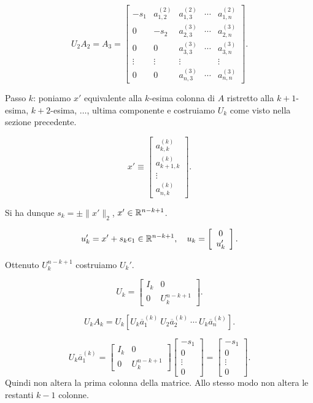 \[U_2A_2 = A_3 = \left[
\begin{array}{ccccc}
-s_1 & a_{1,2}^{(2)} & a_{1,3}^{(2)} &\cdots & a_{1,n}^{(2)} \\
0   & -s_2 & a_{2,3}^{(3)} &\cdots & a_{2,n}^{(3)} \\
0   & 0 & a_{3,3}^{(3)} &\cdots & a_{3,n}^{(3)} \\
\vdots & \vdots & \vdots & & \vdots \\
0 & 0 & a_{n,3}^{(3)} & \cdots & a_{n,n}^{(3)}
\end{array}
\right].\]

Passo $k$: poniamo $x'$ equivalente alla $k$-esima colonna di $A$
ristretto alla $k+1$-esima, $k+2$-esima, $\ldots$, ultima componente e
costruiamo $U_k$ come visto nella sezione precedente.

\[x' \equiv\left[
\begin{array}{c}
 a_{k,k}^{(k)} \\
a_{k+1,k}^{(k)} \\
 \vdots \\
 a_{n,k}^{(k)}
\end{array}
\right].
\]

Si ha dunque $s_k =\pm \|x'\|_2$, $x' \in \mathbb{R}^{n-k+1}$.

\[u_k' = x' + s_ke_1 \in \mathbb{R}^{n-k+1}, \quad u_k =
\left[
\begin{array}{c}
0 \\
u_k'
\end{array}\right].\]

Ottenuto $U_k^{n-k+1}$ costruiamo $U_k'$.

\[U_k = \left[
\begin{array}{c|c}
I_k & 0 \\
\hline
0 & U_k^{n-k+1}
\end{array}
\right].\]

\[
U_kA_k = U_k\left[U_k\overline{a}_1^{(k)} \ U_2\overline{a}_2^{(k)} \ \cdots\
U_k\overline{a}_n^{(k)}\right].\]

\[U_k\overline{a}_1^{(k)} = \left[
\begin{array}{c|c}
I_k & 0 \\
\hline
0 & U_k^{n-k+1}
\end{array}
\right]\left[
\begin{array}{c}
-s_1 \\ 0 \\ \vdots \\ 0
\end{array}
\right] = \left[
\begin{array}{c}
-s_1 \\ 0 \\ \vdots \\ 0
\end{array}
\right].\]
Quindi non altera la prima colonna della matrice. Allo stesso modo non altera
le restanti $k-1$ colonne.

